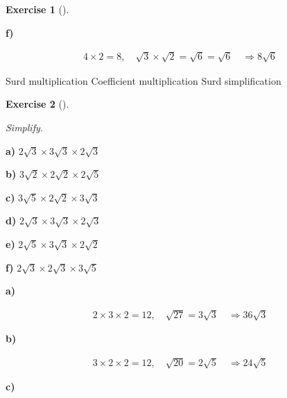 \documentclass[
  letterpaper,
  DIV=11,
  numbers=noendperiod]{scrreprt}
\theoremstyle{definition}
\newtheorem{exercise}{Exercise}[chapter]
\theoremstyle{remark}
\begin{document}
\begin{exercise}[]
\begin{tcolorbox}
\textbf{f)}

\[
\begin{aligned}
4\times 2=8,\quad\sqrt{3}\times\sqrt{2}=\sqrt{6}=\sqrt{6}\quad\Rightarrow8\sqrt{6}
\end{aligned}
\]

\end{tcolorbox}

{Surd multiplication} {Coefficient multiplication} {Surd simplification}

\end{exercise}

\begin{exercise}[]\protect\hypertarget{exr-u2-37}{}\label{exr-u2-37}

\emph{Simplify.}

\textbf{a)} \(\displaystyle 2\sqrt{3}\times 3\sqrt{3}\times 2\sqrt{3}\)

\textbf{b)} \(\displaystyle 3\sqrt{2}\times 2\sqrt{2}\times 2\sqrt{5}\)

\textbf{c)} \(\displaystyle 3\sqrt{5}\times 2\sqrt{2}\times 3\sqrt{3}\)

\textbf{d)} \(\displaystyle 2\sqrt{3}\times 3\sqrt{3}\times 2\sqrt{3}\)

\textbf{e)} \(\displaystyle 2\sqrt{5}\times 3\sqrt{3}\times 2\sqrt{2}\)

\textbf{f)} \(\displaystyle 2\sqrt{3}\times 2\sqrt{3}\times 3\sqrt{5}\)

\begin{tcolorbox}[enhanced jigsaw, opacitybacktitle=0.6, coltitle=black, arc=.35mm, colframe=quarto-callout-tip-color-frame, colback=white, bottomrule=.15mm, left=2mm, colbacktitle=quarto-callout-tip-color!10!white, titlerule=0mm, opacityback=0, title=\textcolor{quarto-callout-tip-color}{\faLightbulb}\hspace{0.5em}{🔍 View Solutions}, leftrule=.75mm, breakable, rightrule=.15mm, bottomtitle=1mm, toptitle=1mm, toprule=.15mm]

\textbf{a)}

\[
\begin{aligned}
2\times 3\times 2=12,\quad\sqrt{27}=3\sqrt{3}\quad\Rightarrow36\sqrt{3}
\end{aligned}
\]

\textbf{b)}

\[
\begin{aligned}
3\times 2\times 2=12,\quad\sqrt{20}=2\sqrt{5}\quad\Rightarrow24\sqrt{5}
\end{aligned}
\]

\textbf{c)}


\end{tcolorbox}
\end{exercise}
\end{document}
